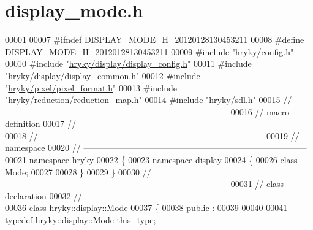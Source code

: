 \hypertarget{display__mode_8h_source}{\section{display\-\_\-mode.\-h}
}

\begin{DoxyCode}
00001 
00007 \textcolor{preprocessor}{#ifndef DISPLAY\_MODE\_H\_20120128130453211}
00008 \textcolor{preprocessor}{}\textcolor{preprocessor}{#define DISPLAY\_MODE\_H\_20120128130453211}
00009 \textcolor{preprocessor}{}\textcolor{preprocessor}{#include "hryky/config.h"}
00010 \textcolor{preprocessor}{#include "\hyperlink{display__config_8h}{hryky/display/display_config.h}"}
00011 \textcolor{preprocessor}{#include "\hyperlink{display__common_8h}{hryky/display/display_common.h}"}
00012 \textcolor{preprocessor}{#include "\hyperlink{pixel__format_8h}{hryky/pixel/pixel_format.h}"}
00013 \textcolor{preprocessor}{#include "\hyperlink{reduction__map_8h}{hryky/reduction/reduction_map.h}"}
00014 \textcolor{preprocessor}{#include "\hyperlink{sdl_8h}{hryky/sdl.h}"}
00015 \textcolor{comment}{//
      ------------------------------------------------------------------------------}
00016 \textcolor{comment}{// macro definition}
00017 \textcolor{comment}{//
      ------------------------------------------------------------------------------}
00018 \textcolor{comment}{//
      ------------------------------------------------------------------------------}
00019 \textcolor{comment}{// namespace}
00020 \textcolor{comment}{//
      ------------------------------------------------------------------------------}
00021 \textcolor{keyword}{namespace }hryky
00022 \{
00023 \textcolor{keyword}{namespace }display
00024 \{
00026     \textcolor{keyword}{class }Mode;
00027 
00028 \}
00029 \}
00030 \textcolor{comment}{//
      ------------------------------------------------------------------------------}
00031 \textcolor{comment}{// class declaration}
00032 \textcolor{comment}{//
      ------------------------------------------------------------------------------}
\hypertarget{display__mode_8h_source_l00036}{}\hyperlink{classhryky_1_1display_1_1_mode}{00036} \textcolor{comment}{}\textcolor{keyword}{class }\hyperlink{classhryky_1_1display_1_1_mode}{hryky::display::Mode}
00037 \{
00038 \textcolor{keyword}{public} :
00039 
00040     
\hypertarget{display__mode_8h_source_l00041}{}\hyperlink{classhryky_1_1display_1_1_mode_a0c68f6c39098781552942da1586968bc}{00041}     \textcolor{keyword}{typedef} \hyperlink{classhryky_1_1display_1_1_mode}{hryky::display::Mode}                    \hyperlink{classhryky_1_1display_1_1_mode_a0c68f6c39098781552942da1586968bc}{this_type};

\end{DoxyCode}
